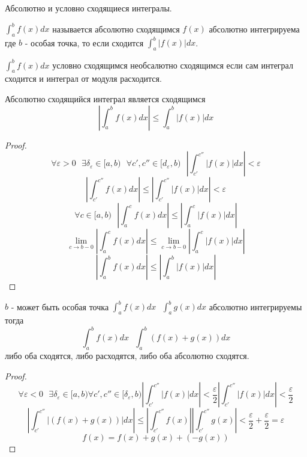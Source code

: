 \begin{title}
  Абсолютно и условно сходящиеся интегралы.
\end{title}

\begin{defin}
  $\int_a^b f(x)dx$ называется абсолютно сходящимся $f(x)$ абсолютно
интегрируема где $b$ - особая точка, то если сходится $\int_a^b |f(x)|dx$.
\end{defin}

\begin{defin}
  $\int_a^b f(x)dx$ условно сходящимся необсалютно сходящимся если сам интеграл
сходится и интеграл от модуля расходится.
\end{defin}

\begin{theorem}
  Абсолютно сходящийся интеграл является сходящимся
  $$
  \left| \int_a^b f(x)dx \right| \le \int_a^b |f(x)|dx
  $$
\end{theorem}

\begin{proof}
  $$
  \forall \varepsilon > 0 ~~~ \exists \delta_{\varepsilon} \in [a,b) ~~~
  \forall c',c'' \in [d_{\varepsilon}, b) ~~~
  \left| \int_{c'}^{c''} |f(x)|dx \right| < \varepsilon
  $$
  $$
  \left| \int_{c'}^{c''} f(x)dx \right| \le
  \left| \int_{c'}^{c''} |f(x)|dx \right| < \varepsilon
  $$
  $$
  \forall c \in [a,b) ~~~ \left| \int_a^c f(x)dx \right| \le
  \left| \int_a^c |f(x)|dx \right|
  $$
  $$
  \lim_{c \to b-0} \left| \int_a^{c} f(x)dx \right| \le
  \lim_{c \to b-0} \left| \int_a^c |f(x)|dx \right|
  $$
  $$
  \left| \int_a^b f(x)dx \right| \le
  \left| \int_a^b |f(x)|dx \right|
  $$
\end{proof}

\begin{theorem}
  $b$ - может быть особая точка $\int_a^b f(x)dx ~~~ \int_a^b g(x)dx$
абсолютно интегрируемы тогда
  $$
  \int_a^b f(x)dx ~~~ \int_a^b (f(x) + g(x)) dx
  $$
  либо оба сходятся, либо расходятся, либо оба абсолютно сходятся.
\end{theorem}

\begin{proof}
  $$
  \forall \varepsilon < 0 ~~~ \exists \delta_{\varepsilon} \in [a,b)
  \forall c', c'' \in [\delta_{\varepsilon}, b)
  \left| \int_{c'}^{c''} |f(x)|dx \right| < \frac{\varepsilon}{2}
  \left| \int_{c'}^{c''} |f(x)|dx \right| < \frac{\varepsilon}{2}
  $$
  $$
  \left| \int_{c'}^{c''} |(f(x) + g(x))| dx \right| \le
  \left| \int_{c'}^{c''} f(x) \right| \left| \int_{c'}^{c''} g(x) \right|
  < \frac{\varepsilon}{2} + \frac{\varepsilon}{2} = \varepsilon
  $$
  $$
  f(x) = f(x) + g(x) + (-g(x))
  $$
\end{proof}

